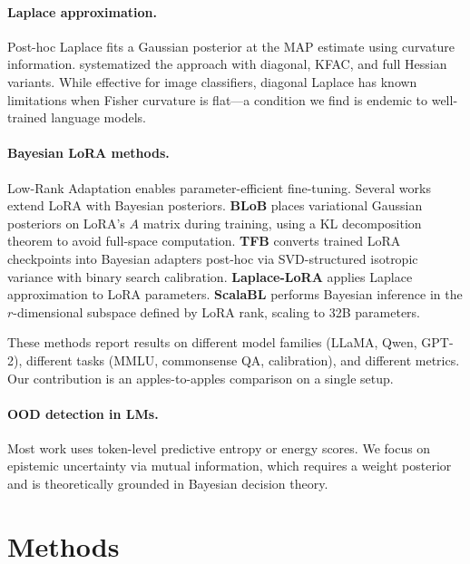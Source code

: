 \documentclass{article}
\begin{document}
\paragraph{Laplace approximation.}
Post-hoc Laplace fits a Gaussian posterior at the MAP estimate using curvature information. \citet{daxberger2021laplace} systematized the approach with diagonal, KFAC, and full Hessian variants. While effective for image classifiers, diagonal Laplace has known limitations when Fisher curvature is flat---a condition we find is endemic to well-trained language models.

\paragraph{Bayesian LoRA methods.}
Low-Rank Adaptation \citep{hu2022lora} enables parameter-efficient fine-tuning. Several works extend LoRA with Bayesian posteriors. \textbf{BLoB} \citep{wang2024blob} places variational Gaussian posteriors on LoRA's $A$ matrix during training, using a KL decomposition theorem to avoid full-space computation. \textbf{TFB} \citep{shi2025training} converts trained LoRA checkpoints into Bayesian adapters post-hoc via SVD-structured isotropic variance with binary search calibration. \textbf{Laplace-LoRA} \citep{yang2024bayesian} applies Laplace approximation to LoRA parameters. \textbf{ScalaBL} \citep{samplawski2025scalable} performs Bayesian inference in the $r$-dimensional subspace defined by LoRA rank, scaling to 32B parameters.

These methods report results on different model families (LLaMA, Qwen, GPT-2), different tasks (MMLU, commonsense QA, calibration), and different metrics. Our contribution is an apples-to-apples comparison on a single setup.

\paragraph{OOD detection in LMs.}
Most work uses token-level predictive entropy or energy scores. We focus on epistemic uncertainty via mutual information, which requires a weight posterior and is theoretically grounded in Bayesian decision theory.

\section{Methods}
\label{sec:methods}
\end{document}
